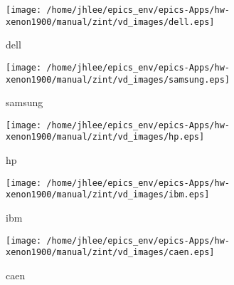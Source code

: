 \noindent
\vspace{1.4cm}
\begin{minipage}{.2\textwidth}
\begin{center}
\texttt{[image: /home/jhlee/epics\_env/epics-Apps/hw-xenon1900/manual/zint/vd\_images/dell.eps]}
\end{center}
\end{minipage}
\begin{minipage}{.7\textwidth}
dell
\end{minipage}


\noindent
\vspace{1.4cm}
\begin{minipage}{.2\textwidth}
\begin{center}
\texttt{[image: /home/jhlee/epics\_env/epics-Apps/hw-xenon1900/manual/zint/vd\_images/samsung.eps]}
\end{center}
\end{minipage}
\begin{minipage}{.7\textwidth}
samsung
\end{minipage}


\noindent
\vspace{1.4cm}
\begin{minipage}{.2\textwidth}
\begin{center}
\texttt{[image: /home/jhlee/epics\_env/epics-Apps/hw-xenon1900/manual/zint/vd\_images/hp.eps]}
\end{center}
\end{minipage}
\begin{minipage}{.7\textwidth}
hp
\end{minipage}


\noindent
\vspace{1.4cm}
\begin{minipage}{.2\textwidth}
\begin{center}
\texttt{[image: /home/jhlee/epics\_env/epics-Apps/hw-xenon1900/manual/zint/vd\_images/ibm.eps]}
\end{center}
\end{minipage}
\begin{minipage}{.7\textwidth}
ibm
\end{minipage}


\noindent
\vspace{1.4cm}
\begin{minipage}{.2\textwidth}
\begin{center}
\texttt{[image: /home/jhlee/epics\_env/epics-Apps/hw-xenon1900/manual/zint/vd\_images/caen.eps]}
\end{center}
\end{minipage}
\begin{minipage}{.7\textwidth}
caen
\end{minipage}


